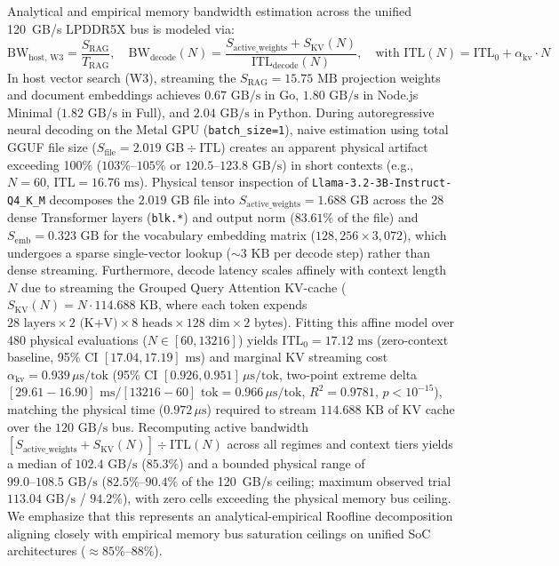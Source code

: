 \documentclass[11pt,a4paper]{article}
\begin{document}
Analytical and empirical memory bandwidth estimation across the unified 120~GB/s LPDDR5X bus is modeled via:
\begin{equation}
\text{BW}_{\text{host, W3}} = \frac{S_{\text{RAG}}}{T_{\text{RAG}}}, \quad \text{BW}_{\text{decode}}(N) = \frac{S_{\text{active\_weights}} + S_{\text{KV}}(N)}{\text{ITL}_{\text{decode}}(N)}, \quad \text{with } \text{ITL}(N) = \text{ITL}_0 + \alpha_{\text{kv}} \cdot N
\end{equation}
In host vector search (W3), streaming the $S_{\text{RAG}} = 15.75\text{ MB}$ projection weights and document embeddings achieves $0.67\text{ GB/s}$ in Go, $1.80\text{ GB/s}$ in Node.js Minimal ($1.82\text{ GB/s}$ in Full), and $2.04\text{ GB/s}$ in Python. During autoregressive neural decoding on the Metal GPU (\texttt{batch\_size=1}), naive estimation using total GGUF file size ($S_{\text{file}} = 2.019\text{ GB} \div \text{ITL}$) creates an apparent physical artifact exceeding 100\% ($103\%\text{--}105\%$ or $120.5\text{--}123.8\text{ GB/s}$) in short contexts (e.g., $N=60$, $\text{ITL} = 16.76\text{ ms}$). Physical tensor inspection of \texttt{Llama-3.2-3B-Instruct-Q4\_K\_M} decomposes the $2.019\text{ GB}$ file into $S_{\text{active\_weights}} = 1.688\text{ GB}$ across the 28 dense Transformer layers (\texttt{blk.*}) and output norm ($83.61\%$ of the file) and $S_{\text{emb}} = 0.323\text{ GB}$ for the vocabulary embedding matrix ($128{,}256 \times 3{,}072$), which undergoes a sparse single-vector lookup ($\sim 3\text{ KB}$ per decode step) rather than dense streaming. Furthermore, decode latency scales affinely with context length $N$ due to streaming the Grouped Query Attention KV-cache ($S_{\text{KV}}(N) = N \cdot 114.688\text{ KB}$, where each token expends $28\text{ layers} \times 2\text{ (K+V)} \times 8\text{ heads} \times 128\text{ dim} \times 2\text{ bytes}$). Fitting this affine model over 480 physical evaluations ($N \in [60, 13216]$) yields $\text{ITL}_0 = 17.12\text{ ms}$ (zero-context baseline, 95\% CI $[17.04, 17.19]\text{ ms}$) and marginal KV streaming cost $\alpha_{\text{kv}} = 0.939\,\mu\text{s/tok}$ (95\% CI $[0.926, 0.951]\,\mu\text{s/tok}$, two-point extreme delta $[29.61 - 16.90]\text{ ms} / [13216 - 60]\text{ tok} = 0.966\,\mu\text{s/tok}$, $R^2 = 0.9781$, $p < 10^{-15}$), matching the physical time ($0.972\,\mu\text{s}$) required to stream $114.688\text{ KB}$ of KV cache over the $120\text{ GB/s}$ bus. Recomputing active bandwidth $[S_{\text{active\_weights}} + S_{\text{KV}}(N)] \div \text{ITL}(N)$ across all regimes and context tiers yields a median of $102.4\text{ GB/s}$ ($85.3\%$) and a bounded physical range of $99.0\text{--}108.5\text{ GB/s}$ ($82.5\%\text{--}90.4\%$ of the 120~GB/s ceiling; maximum observed trial $113.04\text{ GB/s}$ / $94.2\%$), with zero cells exceeding the physical memory bus ceiling. We emphasize that this represents an analytical-empirical Roofline decomposition \cite{williams2009roofline} aligning closely with empirical memory bus saturation ceilings on unified SoC architectures ($\approx 85\%\text{--}88\%$).
\end{document}
